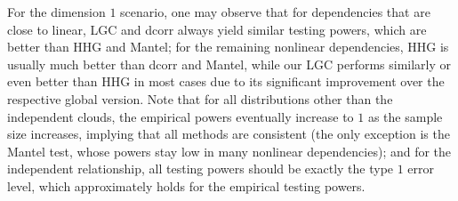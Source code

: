 \documentclass[11pt]{article}
\begin{document}
For the dimension $1$ scenario, one may observe that for dependencies that are close to linear, LGC and dcorr always yield similar testing powers, which are better than HHG and Mantel; for the remaining nonlinear dependencies, HHG is usually much better than dcorr and Mantel, while our LGC performs similarly or even better than HHG in most cases due to its significant improvement over the respective global version. Note that for all distributions other than the independent clouds, the empirical powers eventually increase to $1$ as the sample size increases, implying that all methods are consistent (the only exception is the Mantel test, whose powers stay low in many nonlinear dependencies); and for the independent relationship, all testing powers should be exactly the type $1$ error level, which approximately holds for the empirical testing powers. 
\end{document}
